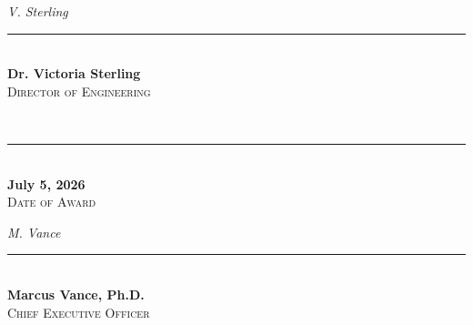 \documentclass[landscape, letterpaper]{article}
\begin{document}
\begin{center}
  \begin{minipage}{0.85\textwidth}
    \centering
    \begin{minipage}[t]{0.3\textwidth}
      \centering
      \textsl{\color{navy!35}\fontsize{15}{15}\selectfont V. Sterling}\\
      \vspace{-0.15in}
      {\color{gold}\rule{\linewidth}{0.8pt}}\\
      \vspace{0.05in}
      {\bfseries\color{navy} Dr. Victoria Sterling}\\
      {\fontsize{9}{11}\selectfont\color{navy!70}\scshape Director of Engineering}
    \end{minipage}
    \hfill
    \begin{minipage}[t]{0.25\textwidth}
      \centering
      \\
      \vspace{-0.15in}
      {\color{gold}\rule{\linewidth}{0.8pt}}\\
      \vspace{0.05in}
      {\bfseries\color{navy} July 5, 2026}\\
      {\fontsize{9}{11}\selectfont\color{navy!70}\scshape Date of Award}
    \end{minipage}
    \hfill
    \begin{minipage}[t]{0.3\textwidth}
      \centering
      \textsl{\color{navy!35}\fontsize{15}{15}\selectfont M. Vance}\\
      \vspace{-0.15in}
      {\color{gold}\rule{\linewidth}{0.8pt}}\\
      \vspace{0.05in}
      {\bfseries\color{navy} Marcus Vance, Ph.D.}\\
      {\fontsize{9}{11}\selectfont\color{navy!70}\scshape Chief Executive Officer}
    \end{minipage}
  \end{minipage}
\end{center}

\vspace*{\fill}
\end{document}
